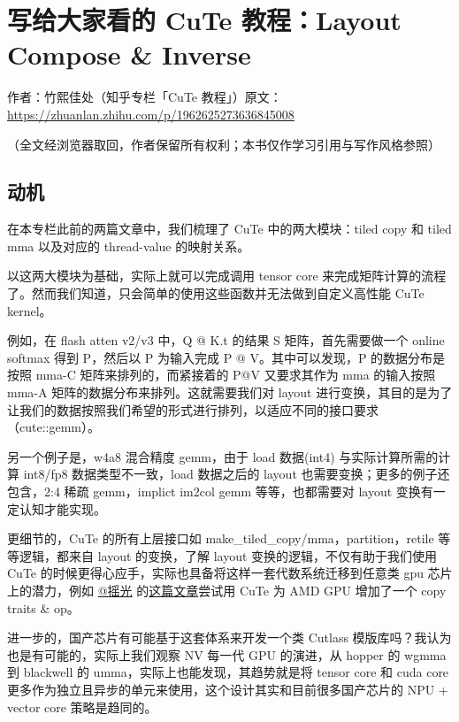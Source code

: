 \chapter{写给大家看的 CuTe 教程：Layout Compose \& Inverse}

\begin{center}\small 作者：竹熙佳处（知乎专栏「CuTe 教程」）\quad 原文：\url{https://zhuanlan.zhihu.com/p/1962625273636845008}\end{center}

（全文经浏览器取回，作者保留所有权利；本书仅作学习引用与写作风格参照）

\section{动机}

在本专栏此前的两篇文章中，我们梳理了 CuTe 中的两大模块：tiled copy 和 tiled mma 以及对应的 thread-value 的映射关系。

以这两大模块为基础，实际上就可以完成调用 tensor core 来完成矩阵计算的流程了。然而我们知道，只会简单的使用这些函数并无法做到自定义高性能 CuTe kernel。

例如，在 flash atten v2/v3 中，Q @ K.t 的结果 S 矩阵，首先需要做一个 online softmax 得到 P，然后以 P 为输入完成 P @ V。其中可以发现，P 的数据分布是按照 mma-C 矩阵来排列的，而紧接着的 P@V 又要求其作为 mma 的输入按照 mma-A 矩阵的数据分布来排列。这就需要我们对 layout 进行变换，其目的是为了让我们的数据按照我们希望的形式进行排列，以适应不同的接口要求（cute::gemm）。

另一个例子是，w4a8 混合精度 gemm，由于 load 数据(int4) 与实际计算所需的计算 int8/fp8 数据类型不一致，load 数据之后的 layout 也需要变换；更多的例子还包含，2:4 稀疏 gemm，implict im2col gemm 等等，也都需要对 layout 变换有一定认知才能实现。

更细节的，CuTe 的所有上层接口如 make\_tiled\_copy/mma，partition，retile 等等逻辑，都来自 layout 的变换，了解 layout 变换的逻辑，不仅有助于我们使用 CuTe 的时候更得心应手，实际也具备将这样一套代数系统迁移到任意类 gpu 芯片上的潜力，例如 \href{https://www.zhihu.com/people/694681341d649ae21f48fa1a2a8984d3}{@摇光} 的\href{https://zhuanlan.zhihu.com/p/688884665}{这篇文章}尝试用 CuTe 为 AMD GPU 增加了一个 copy traits \& op。

进一步的，国产芯片有可能基于这套体系来开发一个类 Cutlass 模版库吗？我认为也是有可能的，实际上我们观察 NV 每一代 GPU 的演进，从 hopper 的 wgmma 到 blackwell 的 umma，实际上也能发现，其趋势就是将 tensor core 和 cuda core 更多作为独立且异步的单元来使用，这个设计其实和目前很多国产芯片的 NPU + vector core 策略是趋同的。

